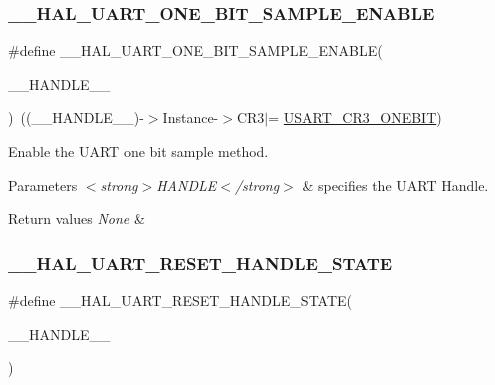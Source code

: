 \subsubsection{\texorpdfstring{\_\_HAL\_UART\_ONE\_BIT\_SAMPLE\_ENABLE}{\_\_HAL\_UART\_ONE\_BIT\_SAMPLE\_ENABLE}}
{\footnotesize\ttfamily \#define \+\_\+\+\_\+\+H\+A\+L\+\_\+\+U\+A\+R\+T\+\_\+\+O\+N\+E\+\_\+\+B\+I\+T\+\_\+\+S\+A\+M\+P\+L\+E\+\_\+\+E\+N\+A\+B\+LE(\begin{DoxyParamCaption}\item[{}]{\+\_\+\+\_\+\+H\+A\+N\+D\+L\+E\+\_\+\+\_\+ }\end{DoxyParamCaption})~((\+\_\+\+\_\+\+H\+A\+N\+D\+L\+E\+\_\+\+\_\+)-\/$>$Instance-\/$>$C\+R3$\vert$= \mbox{\hyperlink{group___peripheral___registers___bits___definition_ga9a96fb1a7beab602cbc8cb0393593826}{U\+S\+A\+R\+T\+\_\+\+C\+R3\+\_\+\+O\+N\+E\+B\+IT}})}



Enable the U\+A\+RT one bit sample method. 


\begin{DoxyParams}{Parameters}
{\em $<$strong$>$\+H\+A\+N\+D\+L\+E$<$/strong$>$} & specifies the U\+A\+RT Handle. \\
\hline
\end{DoxyParams}

\begin{DoxyRetVals}{Return values}
{\em None} & \\
\hline
\end{DoxyRetVals}
\mbox{\label{group___u_a_r_t___exported___macros_ga19deab848407b106998416c78092fa9b}} 
\subsubsection{\texorpdfstring{\_\_HAL\_UART\_RESET\_HANDLE\_STATE}{\_\_HAL\_UART\_RESET\_HANDLE\_STATE}}
{\footnotesize\ttfamily \#define \+\_\+\+\_\+\+H\+A\+L\+\_\+\+U\+A\+R\+T\+\_\+\+R\+E\+S\+E\+T\+\_\+\+H\+A\+N\+D\+L\+E\+\_\+\+S\+T\+A\+TE(\begin{DoxyParamCaption}\item[{}]{\+\_\+\+\_\+\+H\+A\+N\+D\+L\+E\+\_\+\+\_\+ }\end{DoxyParamCaption})}

